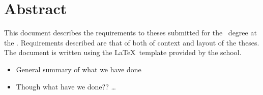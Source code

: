 \chapter*{Abstract}\label{abstract}
This document describes the requirements to theses submitted for the
\ThesisDegreeName\ degree at the \ThesisSchoolName.  Requirements
described are that of both of context and layout of the theses.  The
document is written using the \LaTeX\ template provided by the school.

\begin{itemize}
  \item General summary of what we have done
  \item Though what have we done??
\ldots
\end{itemize}